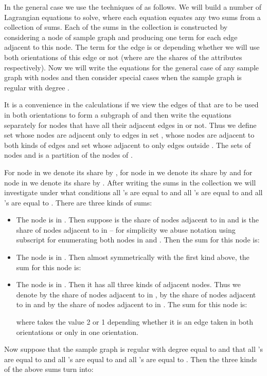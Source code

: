 In the general case we use the techniques of \cite{AU10} as follows. We will build a number of Lagrangian equations to solve, where each equation equates any two
sums from a collection of sums. Each of the sums in the collection is constructed by
considering a node of sample graph  and producing one term
for each edge adjacent to this node. The term for
the edge  is  or  depending
whether we will use both orientations of this edge or not
(where  are the shares of the attributes  respectively).
Now we will write the equations for the general case of any sample
graph  with  nodes and then consider special cases  when the sample graph
 is regular with degree .

It is a convenience in the calculations if we view the edges
of  that are to be used in both orientations to form a subgraph  of 
and then write the equations separately for nodes that have all their adjacent
edges in  or not.
Thus we define set  whose nodes are adjacent only to edges in 
set , whose nodes are
adjacent to both kinds of edges and set  whose adjacent to only edges outside . The sets of nodes   and  is a partition of the nodes of .

For node   in  we denote its share by , for node  in  we denote its share by  and for node  in  we denote its share by . After writing the sums in the
collection we will investigate under what conditions all 's  are equal to  and all 's are equal to  and all 's are equal to . There are three kinds of sums:

\begin{itemize}
\item
The node  is in .  Then suppose  is the share of nodes adjacent to  in  and 
is the share of nodes adjacent to  in  -- for simplicity we abuse notation using subscript  for enumerating both
nodes in  and . Then the sum for this node is:


\item The node  is in . Then almost
 symmetrically with the first kind above, the sum for this node is:


\item The
 node  is in .  Then it has all three kinds of adjacent nodes. Thus we
denote by   the share of nodes adjacent to  in , by   the share of nodes adjacent to  in  and by  the share of nodes adjacent to  in . The sum for this node is:


where  takes the value 2 or 1 depending whether it is an edge taken in both
orientations or only in one orientation.
\end{itemize}
Now suppose  that the sample graph is regular with degree equal to  and that all 's  are equal to  and all 's are equal to  and all 's are equal to . Then the three kinds of the above sums turn into:

